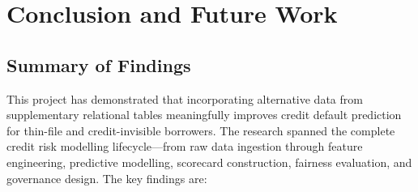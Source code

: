\chapter{Conclusion and Future Work}
\label{chap:conclusion}

\section{Summary of Findings}
\label{sec:findings}

This project has demonstrated that incorporating alternative data from supplementary relational tables meaningfully improves credit default prediction for thin-file and credit-invisible borrowers. The research spanned the complete credit risk modelling lifecycle---from raw data ingestion through feature engineering, predictive modelling, scorecard construction, fairness evaluation, and governance design. The key findings are:

